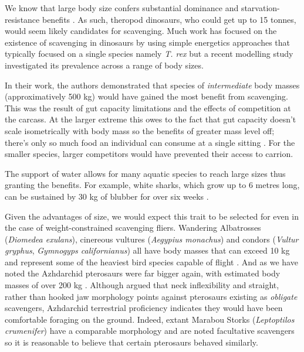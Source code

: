 \documentclass[a4paper,12pt]{article}
\begin{document}
We know that large body size confers substantial dominance and starvation-resistance benefits \citep{ruxton2004obligate}. 
As such, theropod dinosaurs, who could get up to 15 tonnes, would seem likely candidates for scavenging. 
Much work has focused on the existence of scavenging in dinosaurs by using simple energetics approaches that typically focused on a single species namely \textit{T. rex} \citep{ruxton2003could,carbone2011intra} but a recent modelling study investigated its prevalence across a range of body sizes.

In their work, the authors demonstrated that species of \textit{intermediate} body masses (approximatively 500 kg) would have gained the most benefit from scavenging.
This was the result of gut capacity limitations and the effects of competition at the carcass.
At the larger extreme this owes to the fact that gut capacity doesn't scale isometrically with body mass so the benefits of greater mass level off; there's only so much food an individual can consume at a single sitting \citep{calder1996size}.
For the smaller species, larger competitors would have prevented their access to carrion.

The support of water allows for many aquatic species to reach large sizes thus granting the benefits. 
For example, white sharks, which grow up to 6 metres long, can be sustained by 30 kg of blubber for over six weeks \citep{carey1982temperature}. 

Given the advantages of size, we would expect this trait to be selected for even in the case of weight-constrained scavenging fliers.
Wandering Albatrosses (\textit{Diomedea exulans}), cinereous vultures (\textit{Aegypius monachus}) and condors (\textit{Vultur gryphus}, \textit{Gymnogyps californianus}) all have body masses that can exceed 10 kg and represent some of the heaviest bird species capable of flight \citep{weimerskirch1992reproductive,ferguson2001raptors,donazar2002effects}.
And as we have noted the Azhdarchid pterosaurs were far bigger again, with estimated body masses of over 200 kg \citep{witton2010size}.
Although \cite{witton2008reappraisal} argued that neck inflexibility and straight, rather than hooked jaw morphology points against pterosaurs existing as \textit{obligate} scavengers, Azhdarchid terrestrial proficiency indicates they would have been comfortable foraging on the ground.
Indeed, extant Marabou Storks (\textit{Leptoptilos crumenifer}) have a comparable morphology and are noted facultative scavengers \citep{monadjem2012survival} so it is reasonable to believe that certain pterosaurs behaved similarly.
\end{document}
